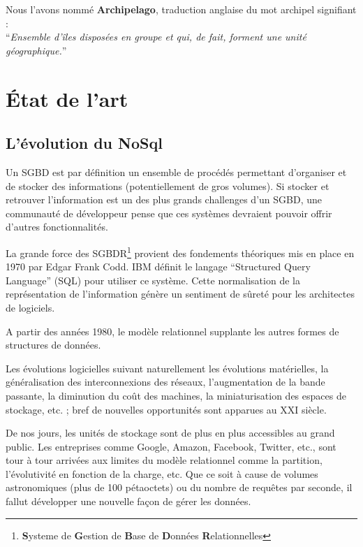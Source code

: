\documentclass[a4paper,fleqn,12pt,oneside]{report}
\begin{document}
\begin{center}
Nous l'avons nommé \textbf{Archipelago}, traduction anglaise du mot archipel signifiant : \\ \enquote{\textit{Ensemble d'îles disposées en groupe et qui, de fait, forment une unité géographique.}}\cite{linternaute} 
\end{center}
 
\part{État de l'art}

\chapter{L'évolution du NoSql}
\label{NoSqlEvol}


Un SGBD est par définition un ensemble de procédés permettant d'organiser et de stocker des informations (potentiellement de gros volumes). Si stocker et retrouver l'information est un des plus grands challenges d'un SGBD, une communauté de développeur pense que ces systèmes devraient pouvoir offrir d'autres fonctionnalités. \cite{coupaye1998modeles}

La grande force des SGBDR\footnote{\textbf{S}ysteme de \textbf{G}estion de \textbf{B}ase de \textbf{D}onnées 
\textbf{R}elationnelles} provient des fondements théoriques mis en place en 1970 par Edgar Frank Codd. IBM définit le langage \enquote{Structured Query Language} (SQL) pour utiliser ce système. Cette normalisation de la représentation de l'information génère un sentiment de sûreté pour les architectes de logiciels.\cite{bruchez2016bases}
 
A partir des années 1980, le modèle relationnel supplante les autres formes de structures de données.

Les évolutions logicielles suivant naturellement les évolutions matérielles, la généralisation des interconnexions des réseaux, l'augmentation de la bande passante, la diminution du coût des machines, la miniaturisation des espaces de stockage, etc. ; bref de nouvelles opportunités sont apparues au XXI siècle.

De nos jours, les unités de stockage sont de plus en plus accessibles au grand public. Les entreprises comme Google, Amazon, Facebook, Twitter, etc., sont tour à tour arrivées aux limites du modèle relationnel \cite{frishman1998comprehensive} comme la partition, l'évolutivité en fonction de la charge, etc. Que ce soit à cause de volumes astronomiques (plus de 100 pétaoctets) ou du nombre de requêtes par seconde, il fallut développer une nouvelle façon de gérer les données.
\end{document}
